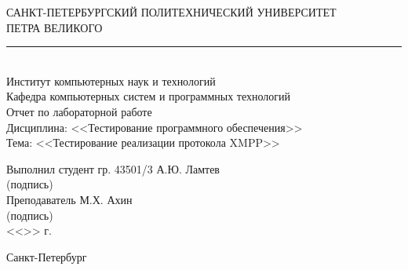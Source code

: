 \begin{titlepage}
\begin{center}
	САНКТ-ПЕТЕРБУРГСКИЙ ПОЛИТЕХНИЧЕСКИЙ УНИВЕРСИТЕТ\\ ПЕТРА ВЕЛИКОГО\\[0.3cm]
	\par\noindent\rule{10cm}{0.4pt}\\[0.3cm]
	Институт компьютерных наук и технологий \\[0.3cm]
	Кафедра компьютерных систем и программных технологий\\[4cm]
	
	Отчет по лабораторной работе\\[3mm]
	Дисциплина: <<Тестирование программного обеспечения>>\\[3mm]
	Тема: <<Тестирование реализации протокола XMPP>>\\[7cm]
\end{center}

\begin{flushleft}
	\hspace*{5mm} Выполнил студент гр. 43501/3  \hspace*{2.5cm}\sign[3cm]\hfill А.Ю. Ламтев\\
	\hspace*{10.4cm} (подпись)\\[3mm]
	\hspace*{5mm} Преподаватель \hspace*{6.0cm}\sign[3cm]\hfill М.Х. Ахин\\
	\hspace*{10.4cm} (подпись)\\[3mm]
	\hspace*{11.1cm} <<\sign[7mm]>> \sign[27mm] \the\year\hspace{1mm} г.
\end{flushleft}

\vfill

\begin{center}
	Санкт-Петербург\\
	\the\year
\end{center}
\end{titlepage}
\addtocounter{page}{1}